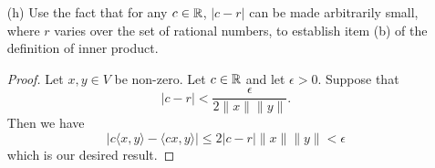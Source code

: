 \documentclass[a4paper]{article}
\begin{document}
\begin{enumerate}
\begin{proof}
        Let \( c \in \R  \), \( r \in \Q  \), and \( x,y \in V  \). Using part (e), we can write
        \begin{align*}
        | c \langle x , y \rangle - \langle cx , y \rangle | &= | c \langle x , y \rangle - r \langle x , y \rangle + r \langle x , y \rangle  - \langle cx , y \rangle |   \\
                                                             &= | (c-r)\langle x , y \rangle  + \langle (r-c)x , y \rangle | \\ 
                                                             &= | (c-r) \langle x , y \rangle - \langle (c -r)x , y \rangle |.
    \end{align*}
    Working with the second equality, we can use the triangle inequality to write
    \begin{align*}
    | (c-r) \langle x , y \rangle + \langle (r-c)x , y \rangle | &\leq | (c-r) \langle x , y \rangle  | + | \langle (r-c)x , y \rangle |   \\  
                                                                 &= | c-r  | | \langle x , y \rangle | + | \langle (r-c)x , y \rangle | \\ 
                                                                 &\leq | c-r | \|x\|\|y\| + \|(r-c)x\| \|y\| \\ 
                                                                 &= | c-r  | \|x\| \|y\| + | c-r  | \|x\| \|y\|  \\
                                                                 &= 2 | c-r  | \|x\| \|y\|.
\end{align*}
Hence, we conclude that
        \[ | c \langle x , y \rangle - \langle cx , y \rangle | = | (c-r)\langle x , y \rangle - \langle (c-r)x ,y  \rangle | \leq 2 | c - r  |  \|x\| \|y\|.   \]
        \end{proof}
    \item[(h)] Use the fact that for any \( c \in \R  \), \( | c -r  |  \) can be made arbitrarily small, where \( r  \) varies over the set of rational numbers, to establish item (b) of the definition of inner product.
        \begin{proof}
        Let \( x,y \in V  \) be non-zero. Let \( c \in \R  \) and let \( \epsilon > 0  \). Suppose that
        \[  | c - r  |  < \frac{ \epsilon  }{ 2 \|x \| \|y\| }. \]
        Then we have
        \[  | c \langle x  , y \rangle - \langle cx , y \rangle |  \leq 2 | c - r  |  \| x \| \|y\| < \epsilon     \]
        which is our desired result.
        \end{proof}
\end{enumerate}
\end{document}
